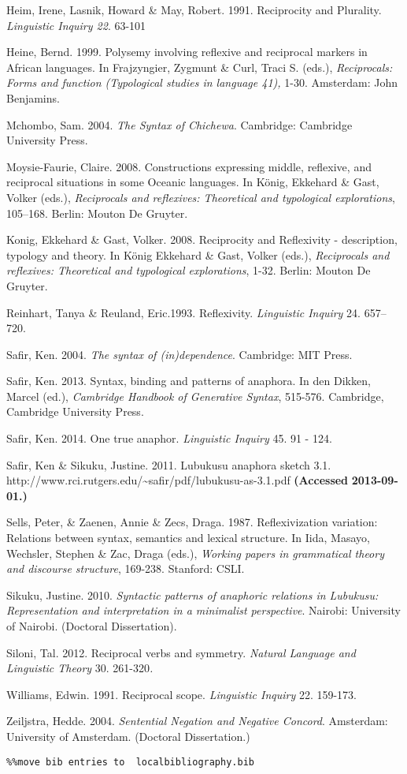 Heim, Irene, Lasnik, Howard \& May, Robert. 1991. Reciprocity and Plurality. \textit{Linguistic Inquiry 22}. 63-101

Heine, Bernd. 1999. Polysemy involving reflexive and reciprocal markers in African languages. In Frajzyngier, Zygmunt \& Curl, Traci S. (eds.), \textit{Reciprocals: Forms and function (Typological studies in language 41), }1-30. Amsterdam: John Benjamins.

Mchombo, Sam. 2004. \textit{The Syntax of Chichewa}. Cambridge: Cambridge University Press. 

Moysie-Faurie, Claire. 2008. Constructions expressing middle, reflexive, and reciprocal situations in some Oceanic languages. In König, Ekkehard \& Gast, Volker (eds.), \textit{Reciprocals and reflexives: Theoretical and typological explorations}, 105–168. Berlin: Mouton De Gruyter.

Konig, Ekkehard \& Gast, Volker. 2008. Reciprocity and Reflexivity - description, typology and theory. In König Ekkehard \& Gast, Volker (eds.), \textit{Reciprocals and reflexives: Theoretical and typological explorations}, 1-32. Berlin: Mouton De Gruyter.

Reinhart, Tanya \& Reuland, Eric.1993. Reﬂexivity. \textit{Linguistic Inquiry} 24. 657–720.

Safir, Ken. 2004. \textit{The syntax of (in)dependence}. Cambridge: MIT Press.

Safir, Ken. 2013. Syntax, binding and patterns of anaphora. In den Dikken, Marcel (ed.), \textit{Cambridge Handbook of Generative Syntax}, 515-576. Cambridge, Cambridge\textit{ }University Press.

Safir, Ken. 2014. One true anaphor. \textit{Linguistic Inquiry} 45. 91 - 124.

Safir, Ken \& Sikuku, Justine. 2011. Lubukusu anaphora sketch 3.1. http://www.rci.rutgers.edu/{\textasciitilde}safir/pdf/lubukusu-as-3.1.pdf \textbf{\textmd{(Accessed}}\textbf{ 2013-09-01.)}

Sells, Peter, \& Zaenen, Annie \& Zecs, Draga. 1987. Reflexivization variation: Relations between syntax, semantics and lexical structure. In Iida, Masayo, Wechsler, Stephen \& Zac, Draga (eds.), \textit{Working papers in grammatical theory and discourse structure}, 169-238. Stanford: CSLI. 

Sikuku, Justine. 2010. \textit{Syntactic patterns of anaphoric relations in Lubukusu: Representation and interpretation in a minimalist perspective}. Nairobi: University of Nairobi. (Doctoral Dissertation).

Siloni, Tal. 2012. Reciprocal verbs and symmetry. \emph{Natural Language and Linguistic Theory} 30. 261-320\emph{.}

Williams, Edwin. 1991. Reciprocal scope. \textit{Linguistic Inquiry} 22. 159-173.

Zeiljstra, Hedde. 2004. \textit{Sentential Negation and Negative Concord}. Amsterdam: University of Amsterdam. (Doctoral Dissertation.)


\begin{verbatim}%%move bib entries to  localbibliography.bib
\end{verbatim}
